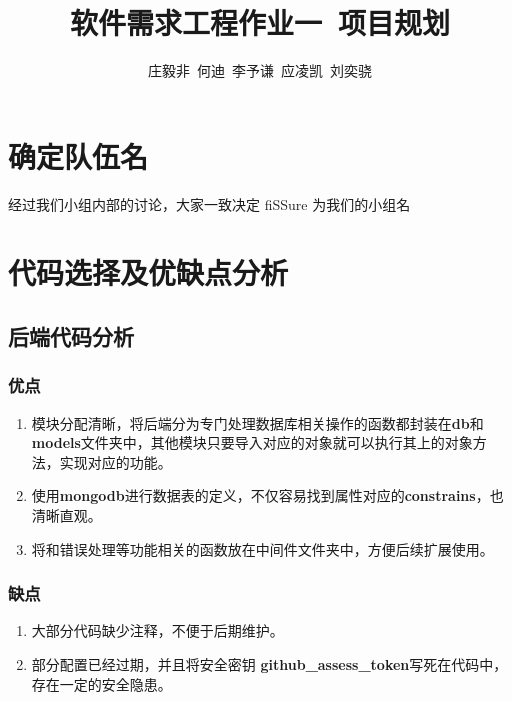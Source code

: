 \documentclass{article}
\title{软件需求工程作业一\ 项目规划}
\author{庄毅非\ 何迪\ 李予谦\ 应凌凯\ 刘奕骁}
\begin{document}
\maketitle

\section{确定队伍名}
经过我们小组内部的讨论，大家一致决定 fiSSure 为我们的小组名

\section{代码选择及优缺点分析}

\subsection{后端代码分析}
\subsubsection{优点}

\begin{enumerate}
    \item 模块分配清晰，将后端分为专门处理数据库相关操作的函数都封装在\textbf{db}和\textbf{models}文件夹中，其他模块只要导入对应的对象就可以执行其上的对象方法，实现对应的功能。
    \item 使用\textbf{mongodb}进行数据表的定义，不仅容易找到属性对应的\textbf{constrains}，也清晰直观。
    \item 将和错误处理等功能相关的函数放在中间件文件夹中，方便后续扩展使用。
\end{enumerate}

\subsubsection{缺点}
\begin{enumerate}
    \item 大部分代码缺少注释，不便于后期维护。
    \item 部分配置已经过期，并且将安全密钥 \textbf{github\_assess\_token}写死在代码中，存在一定的安全隐患。
\end{enumerate}
\end{document}
